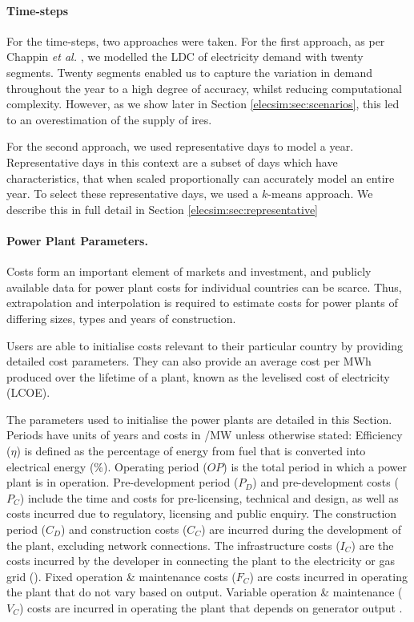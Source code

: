 \paragraph{Time-steps} For the time-steps, two approaches were taken. For the first approach, as per Chappin \textit{et al.} \cite{Chappin2017}, we modelled the LDC of electricity demand with twenty segments. Twenty segments enabled us to capture the variation in demand throughout the year to a high degree of accuracy, whilst reducing computational complexity. However, as we show later in Section \ref{elecsim:sec:scenarios}, this led to an overestimation of the supply of \acrshort{ires}. 

For the second approach, we used representative days to model a year. Representative days in this context are a subset of days which have characteristics, that when scaled proportionally can accurately model an entire year. To select these representative days, we used a $k$-means approach. We describe this in full detail in Section \ref{elecsim:sec:representative}



\paragraph{Power Plant Parameters.}\label{elecsim:ssssec:powerplantparameters} Costs form an important element of markets and investment, and publicly available data for power plant costs for individual countries can be scarce. Thus, extrapolation and interpolation is required to estimate costs for power plants of differing sizes, types and years of construction.

Users are able to initialise costs relevant to their particular country by providing detailed cost parameters. They can also provide an average cost per MWh produced over the lifetime of a plant, known as the levelised cost of electricity (LCOE).

The parameters used to initialise the power plants are detailed in this Section. Periods have units of years and costs in \textsterling/MW unless otherwise stated: Efficiency ($\eta$) is defined as the percentage of energy from fuel that is converted into electrical energy (\%). Operating period ($OP$) is the total period in which a power plant is in operation. Pre-development period ($P_D$) and pre-development costs ($P_C$) include the time and costs for pre-licensing, technical and design, as well as costs incurred due to regulatory, licensing and public enquiry. The construction period ($C_D$) and construction costs ($C_C$) are incurred during the development of the plant, excluding network connections. The infrastructure costs ($I_C$) are the costs incurred by the developer in connecting the plant to the electricity or gas grid (\textsterling). Fixed operation \& maintenance costs ($F_C$) are costs incurred in operating the plant that do not vary based on output. Variable operation \& maintenance ($V_C$) costs are incurred in operating the plant that depends on generator output \cite{Ltd2016}.



